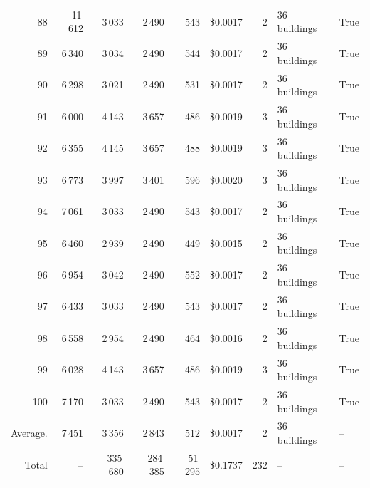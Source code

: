 \documentclass[a4paper,11pt]{article}
\begin{document}
\begin{table}[ht]
\begin{tabular}{r r r r r r r p{3cm} l}
88 & 11\,612 & 3\,033 & 2\,490 & 543 & \$0.0017 & 2 & 36 buildings & True \\
89 & 6\,340 & 3\,034 & 2\,490 & 544 & \$0.0017 & 2 & 36 buildings & True \\
90 & 6\,298 & 3\,021 & 2\,490 & 531 & \$0.0017 & 2 & 36 buildings & True \\
91 & 6\,000 & 4\,143 & 3\,657 & 486 & \$0.0019 & 3 & 36 buildings & True \\
92 & 6\,355 & 4\,145 & 3\,657 & 488 & \$0.0019 & 3 & 36 buildings & True \\
93 & 6\,773 & 3\,997 & 3\,401 & 596 & \$0.0020 & 3 & 36 buildings & True \\
94 & 7\,061 & 3\,033 & 2\,490 & 543 & \$0.0017 & 2 & 36 buildings & True \\
95 & 6\,460 & 2\,939 & 2\,490 & 449 & \$0.0015 & 2 & 36 buildings & True \\
96 & 6\,954 & 3\,042 & 2\,490 & 552 & \$0.0017 & 2 & 36 buildings & True \\
97 & 6\,433 & 3\,033 & 2\,490 & 543 & \$0.0017 & 2 & 36 buildings & True \\
98 & 6\,558 & 2\,954 & 2\,490 & 464 & \$0.0016 & 2 & 36 buildings & True \\
99 & 6\,028 & 4\,143 & 3\,657 & 486 & \$0.0019 & 3 & 36 buildings & True \\
100 & 7\,170 & 3\,033 & 2\,490 & 543 & \$0.0017 & 2 & 36 buildings & True \\
\hline
Average. & 7\,451 & 3\,356 & 2\,843 & 512 & \$0.0017 & 2 & 36 buildings & -- \\
Total & -- & 335\,680 & 284\,385 & 51\,295 & \$0.1737 & 232 & -- & -- \\
\hline
\end{tabular}
\end{table}

\clearpage
\end{document}
